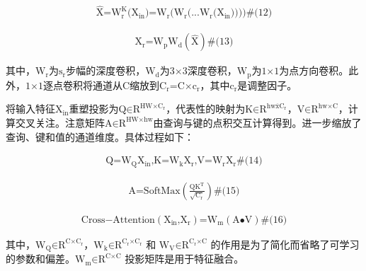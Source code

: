 \documentclass[
  12pt,
]{article}
\begin{document}
\[\begin{array}{r}
\widehat{\text{X}}\text{=}\text{W}_{\text{r}}^{\text{K}}\text{(}\text{X}_{\text{in}}\text{)=}\text{W}_{\text{r}}\text{(}\text{W}_{\text{r}}\text{(}\text{...W}_{\text{r}}\text{(}\text{X}_{\text{in}}\text{))))}\#\text{(12)}
\end{array}\]

\[\begin{array}{r}
\text{X}_{\text{r}}\text{=}\text{W}_{\text{p}}\text{W}_{\text{d}}\left( \widehat{\text{X}} \right)\#\text{(13)}
\end{array}\]

其中，\(\text{W}_{\text{r}}\)为\(\text{s}_{\text{r}}\)步幅的深度卷积，\(\text{W}_{\text{d}}\)为\(\text{3×3}\)深度卷积，\(\text{W}_{\text{p}}\)为\(\text{1×1}\)为点方向卷积。此外，\(\text{1×1}\)逐点卷积将通道从\(\text{C}\)缩放到\(\text{C}_{\text{r}}\text{=C×}\text{c}_{\text{r}}\)，其中\(\text{c}_{\text{r}}\)是调整因子。

将输入特征\(\text{X}_{\text{in}}\)重塑投影为\(\text{Q∈}\text{R}^{\text{HW×}\text{C}_{\text{r}}}\)，代表性的映射为\(\text{K∈}\text{R}^{\text{hw}\overline{\text{x}}\text{C}_{\text{r}}}\)，\(\text{V∈}\text{R}^{\text{hw×C}}\)，计算交叉关注。注意矩阵\(\text{A∈}\text{R}^{\text{HW×hw}}\)由查询与键的点积交互计算得到。进一步缩放了查询、键和值的通道维度。具体过程如下：

\[\begin{array}{r}
\text{Q=}\text{W}_{\text{Q}}\text{X}_{\text{in}}\text{,K=}\text{W}_{\text{k}}\text{X}_{\text{r}}\text{,V=}\text{W}_{\text{r}}\text{X}_{\text{r}}\#\text{(14)}
\end{array}\]

\[\begin{array}{r}
\text{A=SoftMax}\left( \frac{\text{Q}\text{K}^{\text{Τ}}}{\sqrt{\text{C}_{\text{r}}}} \right)\#\text{(15)}
\end{array}\]

\[\begin{array}{r}
\text{Cross−Attention}\left( \text{X}_{\text{in}}\text{,}\text{X}_{\text{r}} \right)\text{=}\text{W}_{\text{m}}\left( \text{A∙V} \right)\#\text{(16)}
\end{array}\]

其中，\(\text{W}_{\text{Q}}\text{∈}\text{R}^{\text{C×}\text{C}_{\text{r}}}\)，\(\text{W}_{\text{k}}\text{∈}\text{R}^{\text{C}_{\text{r}}\text{×}\text{C}_{\text{r}}}\)
和
\(\text{W}_{\text{V}}\text{∈}\text{R}^{\text{C}_{\text{r}}\text{×C}}\)
的作用是为了简化而省略了可学习的参数和偏差。\(\text{W}_{\text{m}}\text{∈}\text{R}^{\text{C×C}}\)
投影矩阵是用于特征融合。
\end{document}
